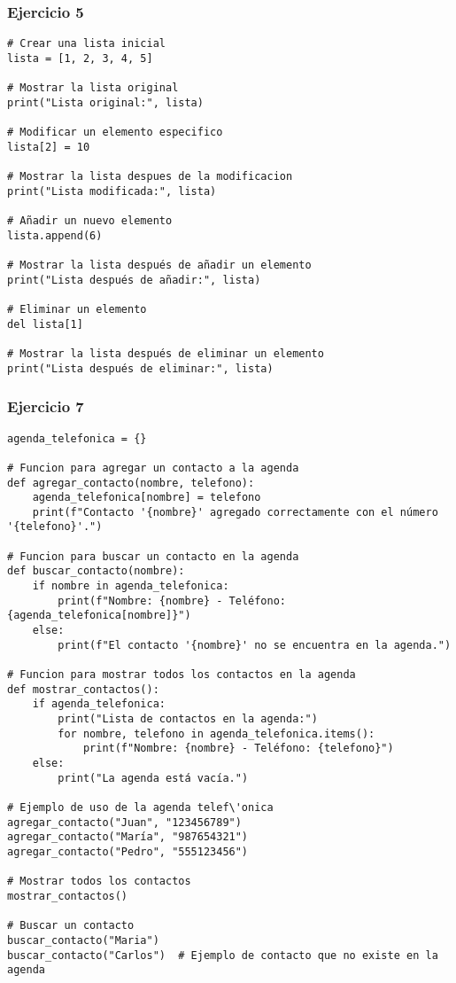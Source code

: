 \documentclass[10pt,a4paper]{article}
\begin{document}
\subsubsection{Ejercicio 5}
\begin{lstlisting}
# Crear una lista inicial
lista = [1, 2, 3, 4, 5]

# Mostrar la lista original
print("Lista original:", lista)

# Modificar un elemento especifico
lista[2] = 10

# Mostrar la lista despues de la modificacion
print("Lista modificada:", lista)

# Añadir un nuevo elemento
lista.append(6)

# Mostrar la lista después de añadir un elemento
print("Lista después de añadir:", lista)

# Eliminar un elemento
del lista[1]

# Mostrar la lista después de eliminar un elemento
print("Lista después de eliminar:", lista)

\end{lstlisting}
\newpage
\subsubsection{Ejercicio 7}
\begin{lstlisting}
agenda_telefonica = {}

# Funcion para agregar un contacto a la agenda
def agregar_contacto(nombre, telefono): 
    agenda_telefonica[nombre] = telefono 
    print(f"Contacto '{nombre}' agregado correctamente con el número '{telefono}'.")

# Funcion para buscar un contacto en la agenda
def buscar_contacto(nombre):
    if nombre in agenda_telefonica:
        print(f"Nombre: {nombre} - Teléfono: {agenda_telefonica[nombre]}")
    else:
        print(f"El contacto '{nombre}' no se encuentra en la agenda.")

# Funcion para mostrar todos los contactos en la agenda
def mostrar_contactos():
    if agenda_telefonica:
        print("Lista de contactos en la agenda:")
        for nombre, telefono in agenda_telefonica.items():
            print(f"Nombre: {nombre} - Teléfono: {telefono}")
    else:
        print("La agenda está vacía.")

# Ejemplo de uso de la agenda telef\'onica
agregar_contacto("Juan", "123456789")
agregar_contacto("María", "987654321")
agregar_contacto("Pedro", "555123456")

# Mostrar todos los contactos
mostrar_contactos()

# Buscar un contacto
buscar_contacto("Maria")
buscar_contacto("Carlos")  # Ejemplo de contacto que no existe en la agenda

\end{lstlisting}
\end{document}

